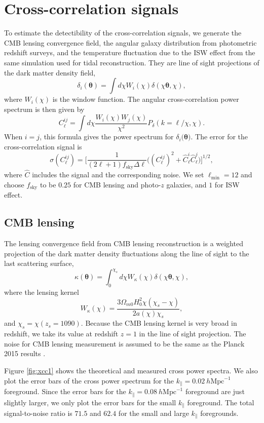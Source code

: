 \documentclass[prd,superscriptaddress,floatfix,notitlepage,nofootinbib,reprint]{revtex4-1}
\newcommand{\mr}{\mathrm}
\newcommand{\kpa}{k_\parallel}
\newcommand{\bea}{\begin{equation}}
\newcommand{\eea}{\end{equation}}
\begin{document}
\section{Cross-correlation signals}
\label{sec:ccs}

To estimate the detectibility of the cross-correlation signals, we generate 
the CMB lensing convergence field, the angular galaxy distribution from 
photometric redshift surveys, and the temperature fluctuation due to the ISW 
effect from the same simulation used for tidal reconstruction.
They are line of sight projections of the dark matter density field,
\bea    
\delta_i(\bm{\theta})=\int d\chi W_i(\chi)\delta(\chi\bm{\theta},\chi),
\eea
where $W_i(\chi)$ is the window function.
The angular cross-correlation power spectrum is then given by
\bea
\label{eq:xpk}
C_\ell^{ij}=\int d\chi\frac{W_i(\chi)W_j(\chi)}{\chi^2}P_\delta(k=\ell/\chi,\chi).
\eea
When $i=j$, this formula gives the power spectrum for $\delta_i(\bm{\theta)}$.
The error for the cross-correlation signal is 
\bea    
\sigma(C_\ell^{ij})=\bigg[\frac{1}{(2\ell+1)f_\mr{sky}\Delta\ell}
\bigg((C_\ell^{ij})^2+\hat{C}_\ell^i
\hat{C}_\ell^j\bigg)\bigg]^{1/2},
\eea
where $\hat{C}$ includes the signal and the corresponding noise.
We set $\ell_\mr{min}=12$ and choose $f_\mr{sky}$ to be $0.25$ for CMB 
lensing and photo-$z$ galaxies, and $1$ for ISW effect.

\subsection{CMB lensing}

The lensing convergence field from CMB lensing reconstruction is a weighted 
projection of the dark matter density fluctuations along the line of sight 
to the last scattering surface,
\bea
\kappa(\bm{\theta})=\int_0^{\chi_s}d\chi 
W_\kappa(\chi)\delta(\chi\bm{\theta},\chi),
\eea
where the lensing kernel
\bea
W_\kappa(\chi)=\frac{3\Omega_{m0}H_0^2\chi(\chi_s-\chi)}{2a(\chi)\chi_s},
\eea
and $\chi_s=\chi(z_s=1090)$.
Because the CMB lensing kernel is very broad in redshift, we take its value at
redshift $z=1$ in the line of sight projection.
The noise for CMB lensing measurement is assumed to be the same as the Planck 
2015 results \cite{2016PlanckLensing}.

Figure \ref{fig:xcc1} shows the theoretical and measured cross power spectra. 
We also plot the error bars of the cross power spectrum for the $\kpa=0.02\ h\mr{Mpc}^{-1}$ foreground.
Since the error bars for the $\kpa=0.08\ h\mr{Mpc}^{-1}$ foreground are just 
slightly larger, we only plot the error bars for the small $\kpa$ foreground.
The total signal-to-noise ratio is $71.5$ and $62.4$ for the small and large
$\kpa$ foregrounds. 
\end{document}
